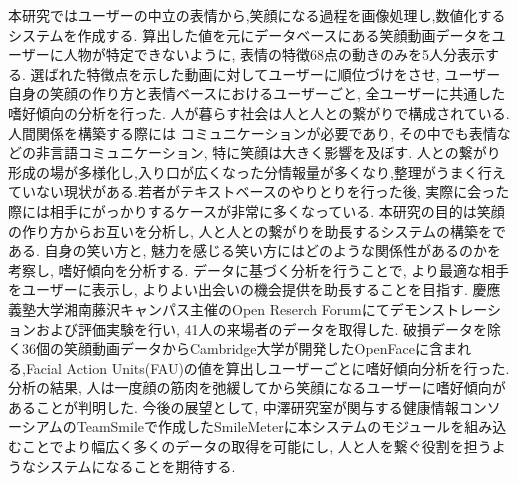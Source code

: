 


\begin{jabstract}
本研究ではユーザーの中立の表情から,笑顔になる過程を画像処理し,数値化するシステムを作成する.
算出した値を元にデータベースにある笑顔動画データをユーザーに人物が特定できないように, 表情の特徴68点の動きのみを5人分表示する.
選ばれた特徴点を示した動画に対してユーザーに順位づけをさせ, ユーザー自身の笑顔の作り方と表情ベースにおけるユーザーごと,
全ユーザーに共通した嗜好傾向の分析を行った.
人が暮らす社会は人と人との繋がりで構成されている.人間関係を構築する際には
コミュニケーションが必要であり, その中でも表情などの非言語コミュニケーション,
特に笑顔は大きく影響を及ぼす.
人との繋がり形成の場が多様化し,入り口が広くなった分情報量が多くなり,整理がうまく行えていない現状がある.若者がテキストベースのやりとりを行った後, 実際に会った際には相手にがっかりするケースが非常に多くなっている.
本研究の目的は笑顔の作り方からお互いを分析し, 人と人との繋がりを助長するシステムの構築をである.
自身の笑い方と, 魅力を感じる笑い方にはどのような関係性があるのかを考察し, 嗜好傾向を分析する.
データに基づく分析を行うことで, より最適な相手をユーザーに表示し, よりよい出会いの機会提供を助長することを目指す.
慶應義塾大学湘南藤沢キャンパス主催のOpen Reserch Forumにてデモンストレーションおよび評価実験を行い, 41人の来場者のデータを取得した. 破損データを除く36個の笑顔動画データからCambridge大学が開発したOpenFaceに含まれる,Facial Action Units(FAU)の値を算出しユーザーごとに嗜好傾向分析を行った.
分析の結果, 人は一度顔の筋肉を弛緩してから笑顔になるユーザーに嗜好傾向があることが判明した.
今後の展望として, 中澤研究室が関与する健康情報コンソーシアムのTeamSmileで作成したSmileMeterに本システムのモジュールを組み込むことでより幅広く多くのデータの取得を可能にし,
人と人を繋ぐ役割を担うようなシステムになることを期待する.
\end{jabstract}



